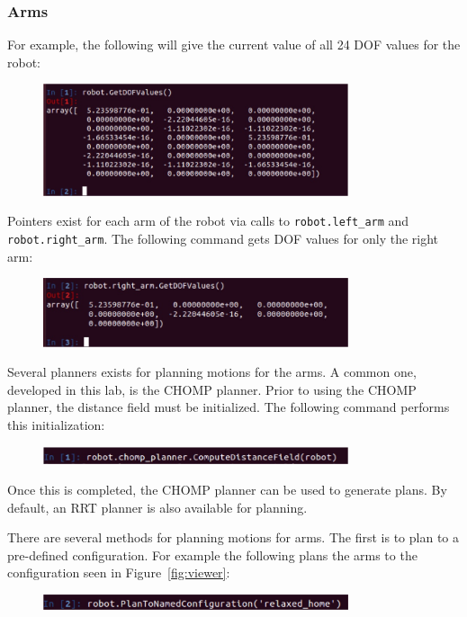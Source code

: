 \documentclass[11pt, oneside]{article}
\begin{document}
\subsubsection{Arms}\label{sec:arms}
For example, the following will give the current value of all 24 DOF values for the robot:
\begin{figure}[h]
\centering
\includegraphics[width=0.8\textwidth]{figs/getdofvalues.jpg}
\end{figure}

Pointers exist for each arm of the robot via calls to \texttt{robot.left\_arm} and \texttt{robot.right\_arm}.  The following command gets DOF values for only the right arm:
\begin{figure}[h]
\centering
\includegraphics[width=0.8\textwidth]{figs/getrightdofvalues.jpg}
\end{figure}

Several planners exists for planning motions for the arms.  A common one, developed in this lab, is the CHOMP planner.  Prior to using the CHOMP planner, the distance field must be initialized.  The following command performs this initialization:
\begin{figure}[h]
\centering
\includegraphics[width=0.8\textwidth]{figs/chompinitialize.jpg}
\end{figure}

Once this is completed, the CHOMP planner can be used to generate plans.  By default, an RRT planner is also available for planning. 

There are several methods for planning motions for arms.  The first is to plan to a pre-defined configuration.  For example the following plans the arms to the configuration seen in Figure~\ref{fig:viewer}:
\begin{figure}[h]
\centering
\includegraphics[width=0.8\textwidth]{figs/namedconfiguration.jpg}
\end{figure}
\end{document}
